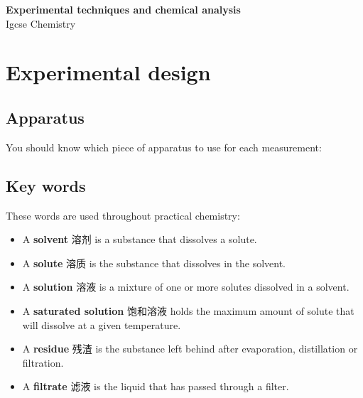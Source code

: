 \documentclass[11pt]{article}
\begin{document}
\begin{center}
  {\LARGE\bfseries Experimental techniques and chemical analysis}\\[0.35em]
  {\large Igcse Chemistry}
\end{center}
\vspace{0.6em}

\section*{Experimental design}

\subsection*{Apparatus}

You should know which piece of apparatus to use for each measurement:

\begin{center}
\end{center}

\subsection*{Key words}

These words are used throughout practical chemistry:

\begin{itemize}
\item A \textbf{solvent} 溶剂 is a substance that dissolves a solute.

\item A \textbf{solute} 溶质 is the substance that dissolves in the solvent.

\item A \textbf{solution} 溶液 is a mixture of one or more solutes dissolved in a solvent.

\item A \textbf{saturated solution} 饱和溶液 holds the maximum amount of solute that will dissolve at a given temperature.

\item A \textbf{residue} 残渣 is the substance left behind after evaporation, distillation or filtration.

\item A \textbf{filtrate} 滤液 is the liquid that has passed through a filter.

\end{itemize}
\end{document}
